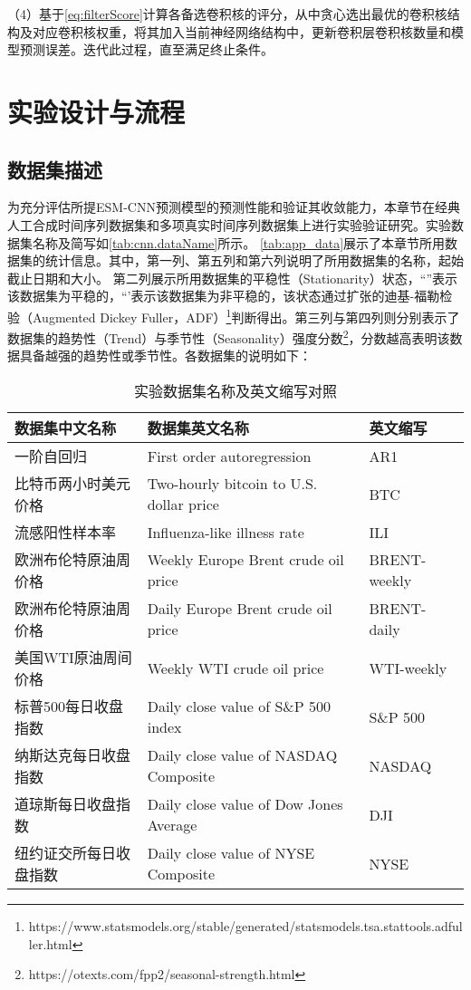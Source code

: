 （4）基于\autoref{eq:filterScore}计算各备选卷积核的评分，从中贪心选出最优的卷积核结构及对应卷积核权重，将其加入当前神经网络结构中，更新卷积层卷积核数量和模型预测误差。迭代此过程，直至满足终止条件。


\section{实验设计与流程\label{sec:esm.exp}}
\subsection{数据集描述}
为充分评估所提ESM-CNN预测模型的预测性能和验证其收敛能力，本章节在经典人工合成时间序列数据集和多项真实时间序列数据集上进行实验验证研究。实验数据集名称及简写如\autoref{tab:cnn.dataName}所示。
\autoref{tab:app_data}展示了本章节所用数据集的统计信息。其中，第一列、第五列和第六列说明了所用数据集的名称，起始截止日期和大小。
第二列展示所用数据集的平稳性（Stationarity）状态，“\cmark”表示该数据集为平稳的，“\xmark'表示该数据集为非平稳的，该状态通过扩张的迪基-福勒检验（Augmented Dickey Fuller，ADF）\footnote{https://www.statsmodels.org/stable/generated/statsmodels.tsa.stattools.adfuller.html}判断得出。第三列与第四列则分别表示了数据集的趋势性（Trend）与季节性（Seasonality）强度分数\footnote{https://otexts.com/fpp2/seasonal-strength.html}，分数越高表明该数据具备越强的趋势性或季节性。各数据集的说明如下：

\begin{table}[!t]
    \centering
    \caption{实验数据集名称及英文缩写对照 \label{tab:cnn.dataName}}
    \begin{tabularx}{\textwidth}{lXl}
        \toprule
        {数据集中文名称} & {数据集英文名称} & 英文缩写 \\  \midrule
        一阶自回归 & First order autoregression & AR1 \\
        比特币两小时美元价格  & Two-hourly bitcoin to U.S. dollar price & BTC          \\
        流感阳性样本率     & Influenza-like illness rate                & ILI          \\
        欧洲布伦特原油周价格  & Weekly Europe Brent crude oil price     & BRENT-weekly \\
        欧洲布伦特原油周价格  & Daily Europe Brent crude oil price      & BRENT-daily  \\
        美国WTI原油周间价格 & Weekly WTI crude oil price              & WTI-weekly   \\
        标普500每日收盘指数 & Daily close value of S\&P 500 index     & S\&P 500     \\
        纳斯达克每日收盘指数  & Daily close value of NASDAQ Composite   & NASDAQ       \\
        道琼斯每日收盘指数   & Daily close value of Dow Jones Average  & DJI          \\
        纽约证交所每日收盘指数 & Daily close value of NYSE Composite     & NYSE         \\
        \bottomrule
        
    \end{tabularx}

\end{table}


